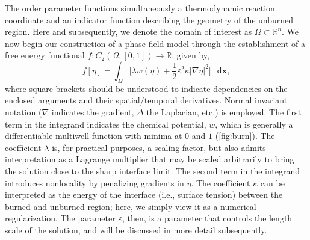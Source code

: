 \documentclass[colorinlistoftodos,review]{elsarticle}
\newcommand*\diff{\mathop{}\!\mathrm{d}}
\begin{document}
The order parameter functions simultaneously a thermodynamic reaction coordinate and an indicator function describing the geometry of the unburned region.
Here and subsequently, we denote the domain of interest as $\Omega\subset\mathbb{R}^n$.
We now begin our construction of a phase field model through the establishment of a free energy functional $f:C_2(\Omega,[0,1])\to\mathbb{R}$, given by,
\begin{equation} \label{eq:freeenergy}
  f[\eta]=\int_{\Omega} \Big[ \lambda w(\eta)+\frac{1}{2}\varepsilon^2\kappa{\left| {\nabla}{\eta} \right|}^2\Big]\,\diff\bm{x}, 
\end{equation}
where square brackets should be understood to indicate dependencies on the enclosed arguments and their spatial\slash temporal derivatives.
Normal invariant notation ($\nabla$ indicates the gradient, $\Delta$ the Laplacian, etc.) is employed.
The first term in the integrand indicates the chemical potential, $w$, which is generally a differentiable multiwell function with minima at $0$ and $1$ (\cref{fig:burn}).
The coefficient $\lambda$ is, for practical purposes, a scaling factor, but also admits interpretation as a Lagrange multiplier that may be scaled arbitrarily to bring the solution close to the sharp interface limit.
The second term in the integrand introduces nonlocality by penalizing gradients in $\eta$.
The coefficient $\kappa$ can be interpreted as the energy of the interface (i.e., surface tension) between the burned and unburned region; here, we simply view it as a numerical regularization.
The parameter $\varepsilon$, then, is a parameter that controls the length scale of the solution, and will be discussed in more detail subsequently.
\end{document}

